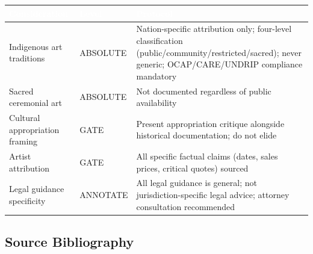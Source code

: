 \documentclass[11pt,letterpaper]{article}
\newcommand{\tableheader}[1]{\textbf{\sffamily\textcolor{white}{#1}}}
\begin{document}
\begin{tabularx}{\textwidth}{L{3.5cm}L{2cm}X}
\toprule
{}
\tableheader{Consideration} & \tableheader{Level} & \tableheader{Protocol} \\
\midrule
Indigenous art traditions & ABSOLUTE & Nation-specific attribution only; four-level classification (public/community/restricted/sacred); never generic; OCAP/CARE/UNDRIP compliance mandatory \\
Sacred ceremonial art & ABSOLUTE & Not documented regardless of public availability \\
Cultural appropriation framing & GATE & Present appropriation critique alongside historical documentation; do not elide \\
Artist attribution & GATE & All specific factual claims (dates, sales prices, critical quotes) sourced \\
Legal guidance specificity & ANNOTATE & All legal guidance is general; not jurisdiction-specific legal advice; attorney consultation recommended \\
\bottomrule
\end{tabularx}

\subsection{Source Bibliography}
\end{document}
